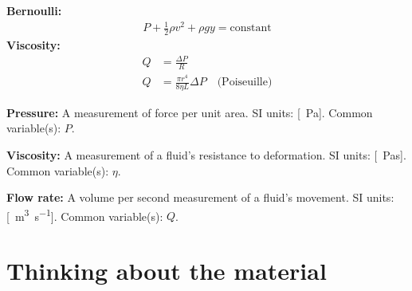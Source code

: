 {{\begin{importantEquations}
\begin{multicols}{2}
\textbf{Bernoulli:}
\begin{align*}
P+\frac{1}{2}\rho v^2+\rho gy=\textrm{constant}
\end{align*}
\textbf{Viscosity:}
\begin{align*}
Q&=\frac{\Delta P}{R}\\
Q&= \frac{\pi r^4}{8\eta L}\Delta P \quad \textrm{(Poiseuille)}
\end{align*}
\end{multicols}
\end{importantEquations}

\begin{definitions}
	\textbf{Pressure:} A measurement of force per unit area. SI units: [\SI{}{Pa}]. Common variable(s): $P$.
	\medskip
	\item \textbf{Viscosity:} A measurement of a fluid's resistance to deformation. SI units: [\SI{}{Pas}]. Common variable(s): $\eta$.
	\medskip
	\item \textbf{Flow rate:} A volume per second measurement of a fluid's movement. SI units: [\SI{}{m^3s^{-1}}]. Common variable(s): $Q$.
	\medskip
\end{definitions}


\newpage
\section{Thinking about the material}

}}
